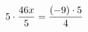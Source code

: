 \documentclass[preview]{standalone}
\begin{document}
\begin{align*}
\special{dvisvgm:raw <g id='unique000'>}5 \cdot \frac{46 x}{5} = \frac{(-9) \cdot 5}{4}\special{dvisvgm:raw </g>}
\end{align*}
\end{document}
